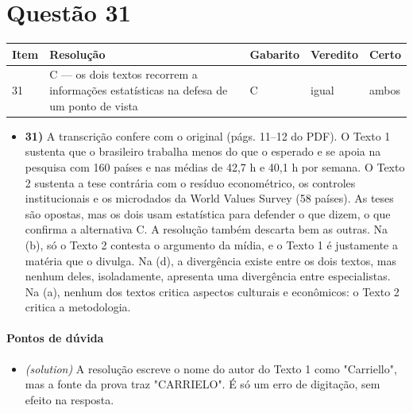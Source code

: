 \documentclass{article}%
\begin{document}
\section*{Questão 31}%
\begin{longtable}{@{}p{} p{} p{} p{} p{}@{}}\toprule Item & Resolução & Gabarito & Veredito & Certo \\ \midrule
31 & C --- os dois textos recorrem a informações estatísticas na defesa de um ponto de vista & C & igual & ambos \\
\bottomrule\end{longtable}%
\begin{itemize}%
\item%
\textbf{31)} A transcrição confere com o original (págs. 11--12 do PDF). O Texto 1 sustenta que o brasileiro trabalha menos do que o esperado e se apoia na pesquisa com 160 países e nas médias de 42,7 h e 40,1 h por semana. O Texto 2 sustenta a tese contrária com o resíduo econométrico, os controles institucionais e os microdados da World Values Survey (58 países). As teses são opostas, mas os dois usam estatística para defender o que dizem, o que confirma a alternativa C. A resolução também descarta bem as outras. Na (b), só o Texto 2 contesta o argumento da mídia, e o Texto 1 é justamente a matéria que o divulga. Na (d), a divergência existe entre os dois textos, mas nenhum deles, isoladamente, apresenta uma divergência entre especialistas. Na (a), nenhum dos textos critica aspectos culturais e econômicos: o Texto 2 critica a metodologia.%
\end{itemize}%
\paragraph{Pontos de dúvida}%
\begin{itemize}%
\item%
\textit{(solution)} A resolução escreve o nome do autor do Texto 1 como "Carriello", mas a fonte da prova traz "CARRIELO". É só um erro de digitação, sem efeito na resposta.%
\end{itemize}%
\end{document}
